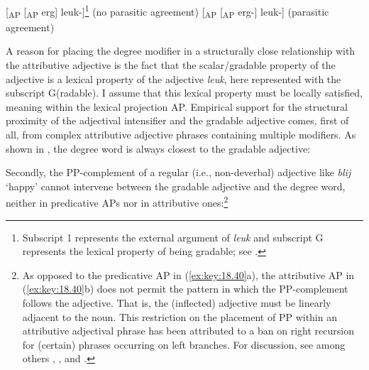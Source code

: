 \documentclass[output=paper]{langsci/langscibook}
\begin{document}
\ea%
    \label{ex:key:18.38}
    \ea {}[\textsubscript{AP} [\textsubscript{AP} erg]
    leuk\textsubscript{}-\Agr{}]\footnote{Subscript 1 represents the
    external argument of \emph{leuk} and subscript G represents the lexical
property of being gradable; see \textcite{Corver1997a}.} (no parasitic agreement)
	\ex {}[\textsubscript{AP} [\textsubscript{AP} erg-\Agr{}] leuk\textsubscript{}-\Agr{}]          (parasitic agreement)
	\z
\z

A reason for placing the degree modifier in a structurally close relationship
with the attributive adjective is the fact that the scalar/gradable property of
the adjective is a lexical property of the adjective \emph{leuk}, here
represented with the subscript G(radable). I assume that this lexical property
must be locally satisfied, meaning within the lexical projection AP. Empirical
support for the structural proximity of the adjectival intensifier and the
gradable adjective comes, first of all, from complex attributive adjective
phrases containing multiple modifiers. As shown in , the degree
word is always closest to the gradable adjective:

\ea%
    \label{ex:key:18.39}
	\z
\z

Secondly, the PP-complement of a regular (i.e., non-deverbal) adjective like
\emph{blij} \enquote*{happy} cannot intervene between the gradable adjective
and the degree word, neither in predicative APs nor in attributive
ones:\footnote{As opposed to the predicative AP in (\ref{ex:key:18.40}a), the
    attributive AP in (\ref{ex:key:18.40}b) does not permit the pattern in which the
    PP-complement follows the adjective. That is, the (inflected) adjective
    must be linearly adjacent to the noun. This restriction on the placement of
    PP within an attributive adjectival phrase has been attributed to a ban on
right recursion for (certain) phrases occurring on left branches. For
discussion, see among others \citet{Emonds1976}, \citet{Williams1981}, and
\citet{fofc}.}
\end{document}
